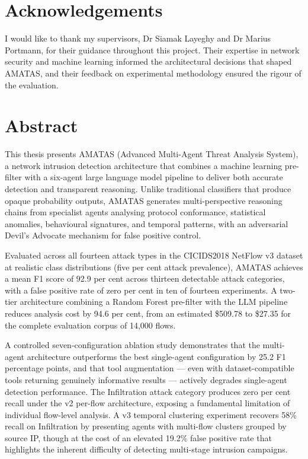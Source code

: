 \documentclass[../main.tex]{subfiles}
\begin{document}
\chapter{Acknowledgements}

I would like to thank my supervisors, Dr Siamak Layeghy and Dr Marius Portmann, for their guidance throughout this project. Their expertise in network security and machine learning informed the architectural decisions that shaped AMATAS, and their feedback on experimental methodology ensured the rigour of the evaluation.

\chapter{Abstract}

This thesis presents AMATAS (Advanced Multi-Agent Threat Analysis System), a network intrusion detection architecture that combines a machine learning pre-filter with a six-agent large language model pipeline to deliver both accurate detection and transparent reasoning. Unlike traditional classifiers that produce opaque probability outputs, AMATAS generates multi-perspective reasoning chains from specialist agents analysing protocol conformance, statistical anomalies, behavioural signatures, and temporal patterns, with an adversarial Devil's Advocate mechanism for false positive control.

Evaluated across all fourteen attack types in the CICIDS2018 NetFlow v3 dataset at realistic class distributions (five per cent attack prevalence), AMATAS achieves a mean F1 score of 92.9 per cent across thirteen detectable attack categories, with a false positive rate of zero per cent in ten of fourteen experiments. A two-tier architecture combining a Random Forest pre-filter with the LLM pipeline reduces analysis cost by 94.6 per cent, from an estimated \$509.78 to \$27.35 for the complete evaluation corpus of 14,000 flows.

A controlled seven-configuration ablation study demonstrates that the multi-agent architecture outperforms the best single-agent configuration by 25.2 F1 percentage points, and that tool augmentation --- even with dataset-compatible tools returning genuinely informative results --- actively degrades single-agent detection performance. The Infiltration attack category produces zero per cent recall under the v2 per-flow architecture, exposing a fundamental limitation of individual flow-level analysis. A v3 temporal clustering experiment recovers 58\% recall on Infiltration by presenting agents with multi-flow clusters grouped by source IP, though at the cost of an elevated 19.2\% false positive rate that highlights the inherent difficulty of detecting multi-stage intrusion campaigns.

\tableofcontents

\listoftables
{}

\listoffigures
{}

\cleardoublepage
\end{document}
